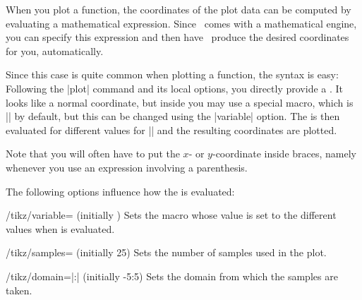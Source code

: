 When you plot a function, the coordinates of the plot data can be computed by
evaluating a mathematical expression. Since \pgfname\ comes with a mathematical
engine, you can specify this expression and then have \tikzname\ produce the
desired coordinates for you, automatically.

Since this case is quite common when plotting a function, the syntax is easy:
Following the |plot| command and its local options, you directly provide a
. It looks like a normal coordinate, but inside you
may use a special macro, which is |\x| by default, but this can be changed
using the |variable| option. The  is then evaluated
for different values for |\x| and the resulting coordinates are plotted.

Note that you will often have to put the $x$- or $y$-coordinate inside braces,
namely whenever you use an expression involving a parenthesis.

The following options influence how the  is
evaluated:
%
\begin{key}{/tikz/variable= (initially \string\x)}
    Sets the macro whose value is set to the different values when
     is evaluated.
\end{key}

\begin{key}{/tikz/samples= (initially 25)}
    Sets the number of samples used in the plot.
\end{key}

\begin{key}{/tikz/domain=|:| (initially -5:5)}
    Sets the domain from which the samples are taken.
\end{key}

